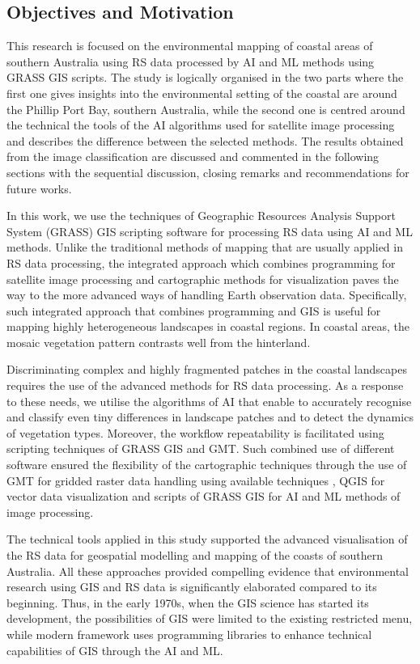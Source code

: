 \documentclass[jmse,article,submit,pdftex,moreauthors]{Definitions/mdpi}
\begin{document}
\subsection{Objectives and Motivation}
This research is focused on the environmental mapping of coastal areas of southern Australia using RS data processed by AI and ML methods using GRASS GIS scripts. The study is logically organised in the two parts where the first one gives insights into the environmental setting of the coastal are around the Phillip Port Bay, southern Australia, while the second one is centred around the technical the tools of the AI algorithms used for satellite image processing and describes the difference between the selected methods. The results obtained from the image classification are discussed and commented in the following sections with the sequential discussion, closing remarks and recommendations for future works. 

In this work, we use the techniques of Geographic Resources Analysis Support System (GRASS) GIS scripting software for processing RS data using AI and ML methods. Unlike the traditional methods of mapping that are usually applied in RS data processing, the integrated approach which combines programming for satellite image processing and cartographic methods for visualization paves the way to the more advanced ways of handling Earth observation data. Specifically, such integrated approach that combines programming and GIS is useful for mapping highly heterogeneous landscapes in coastal regions. In coastal areas,  the mosaic vegetation pattern contrasts well from the hinterland. 

Discriminating complex and highly fragmented patches in the coastal landscapes requires the use of the advanced methods for RS data processing. As a response to these needs, we utilise the algorithms of AI that enable to accurately recognise and classify even tiny differences in landscape patches and to detect the dynamics of vegetation types. Moreover, the workflow repeatability is facilitated using scripting techniques of GRASS GIS and GMT. Such combined use of different software ensured the flexibility of the cartographic techniques through the use of GMT for gridded raster data handling using available techniques \cite{Lemenkova202217}, QGIS for vector data visualization and scripts of GRASS GIS for AI and ML methods of image processing. 

The technical tools applied in this study supported the advanced visualisation of the RS data for geospatial modelling and mapping of the coasts of southern Australia. All these approaches provided compelling evidence that environmental research using GIS and RS data is significantly elaborated compared to its beginning. Thus, in the early 1970s, when the GIS science has started its development, the possibilities of GIS were limited to the existing restricted menu, while modern framework uses programming libraries to enhance technical capabilities of GIS through the AI and ML. 
\end{document}
